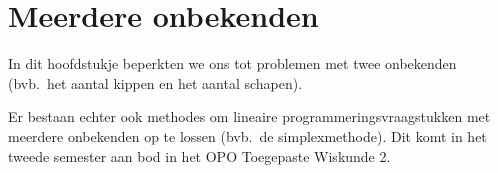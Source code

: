 \section{Meerdere onbekenden}
In dit hoofdstukje beperkten we ons tot problemen met twee onbekenden
(bvb.\ het aantal kippen en het aantal schapen).

Er bestaan echter ook methodes om lineaire programmeringsvraagstukken
met meerdere onbekenden op te lossen (bvb.\ de simplexmethode).
Dit komt in het tweede semester aan bod in het OPO Toegepaste Wiskunde 2.



